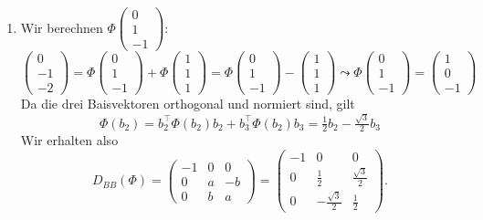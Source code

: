 \begin{enumerate}
	\item Wir berechnen \( \Phi\left( \begin{smallmatrix}
		0 \\ 1 \\ -1
	\end{smallmatrix} \right) \):
	\begin{equation*}
		\left( \begin{smallmatrix}
			0 \\ -1 \\ -2
		\end{smallmatrix} \right) = \Phi\left( \begin{smallmatrix}
			0 \\ 1 \\ -1
		\end{smallmatrix} \right) + \Phi\left( \begin{smallmatrix}
			1 \\ 1 \\ 1
		\end{smallmatrix} \right) = \Phi\left( \begin{smallmatrix}
			0 \\ 1 \\ -1
		\end{smallmatrix} \right) - \left( \begin{smallmatrix}
			1 \\ 1 \\ 1
		\end{smallmatrix} \right) \leadsto \Phi\left( \begin{smallmatrix}
			0 \\ 1 \\ -1
		\end{smallmatrix} \right) = \left( \begin{smallmatrix}
			1 \\ 0 \\ -1
		\end{smallmatrix} \right)
	\end{equation*}
	Da die drei Baisvektoren orthogonal und normiert sind, gilt
	\begin{equation*}
		\Phi(b_2) = b_2^\top\Phi(b_2)b_2+b_3^\top\Phi(b_2)b_3 = \tfrac{1}{2}b_2-\tfrac{\sqrt{3}}{2}b_3
	\end{equation*}
	Wir erhalten also
	\begin{equation*}
		D_{BB}(\Phi) = \begin{pmatrix}
			-1 & 0 & 0 \\
			0 & a & -b \\
			0 & b & a
		\end{pmatrix} = \begin{pmatrix}
			-1 & 0 & 0 \\
			0 & \tfrac{1}{2} & \tfrac{\sqrt{3}}{2} \\
			0 & -\tfrac{\sqrt{3}}{2} & \tfrac{1}{2}
		\end{pmatrix}\text{.}
	\end{equation*}
\end{enumerate}

